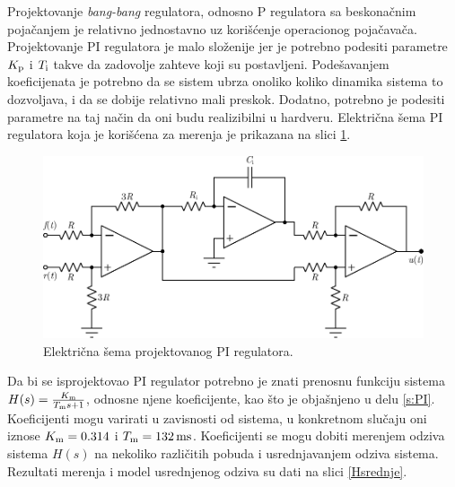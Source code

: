 \documentclass[a4paper, 12pt, diplomski]{etf}
\begin{document}
Projektovanje \textit{bang-bang} regulatora, odnosno P regulatora sa beskonačnim pojačanjem je relativno jednostavno uz korišćenje operacionog pojačavača. Projektovanje PI regulatora je malo složenije jer je potrebno podesiti parametre $K_{\rm p}$ i $T_{\rm i}$ takve da zadovolje zahteve koji su postavljeni. Podešavanjem koeficijenata je potrebno da se sistem ubrza onoliko koliko dinamika sistema to dozvoljava, i da se dobije relativno mali preskok. Dodatno, potrebno je podesiti parametre na taj način da oni budu realizibilni u hardveru. Električna šema PI regulatora koja je korišćena za merenja je prikazana na slici \ref{PIreg}.

\begin{figure}[h!]
    \centering
    \includegraphics[scale=1]{fig/PIregEL.pdf}
    \caption{Električna šema projektovanog PI regulatora.}
    \label{PIreg}
\end{figure}

Da bi se isprojektovao PI regulator potrebno je znati prenosnu funkciju sistema $H(s) = \frac{K_{\rm m}}{T_{\rm m}s + 1}$, odnosne njene koeficijente, kao što je objašnjeno u delu \ref{s:PI}. Koeficijenti mogu varirati u zavisnosti od sistema, u konkretnom slučaju oni iznose $K_{\rm m} = 0.314$ i $T_{\rm m} = 132 \, \rm{ms}$. Koeficijenti se mogu dobiti merenjem odziva sistema $H(s)$ na nekoliko različitih pobuda i usrednjavanjem odziva sistema. Rezultati merenja i model usrednjenog odziva su dati na slici \ref{Hsrednje}.
\end{document}
